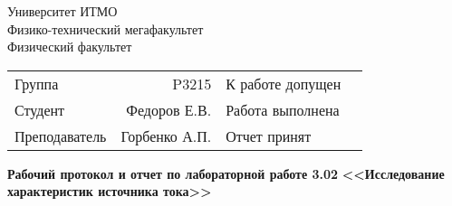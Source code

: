 \begin{titlepage}
	\thispagestyle{firststyle}
	\begin{center}
		Университет ИТМО \\
		Физико-технический мегафакультет \\
		Физический факультет \\
	\end{center}
	\vspace{1cm}
	\begin{center}
		\begin{tabular}{ l r l c }
			Группа        & P3215         & К работе допущен & \hspace{2cm} \\\cline{4-4}
			Студент       & Федоров Е.В.  & Работа выполнена & \hspace{2cm} \\\cline{4-4}
			Преподаватель & Горбенко А.П. & Отчет принят     & \hspace{2cm} \\\cline{4-4}
		\end{tabular}
	\end{center}

	\vspace{2cm}

	\begin{center}
		\Large
    \textbf{Рабочий протокол и отчет по
    лабораторной работе \textnumero{} 3.02}
    \huge
    \textbf{<<Исследование характеристик источника тока>>}
  \end{center}
\end{titlepage}
